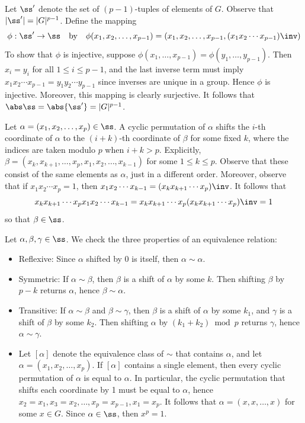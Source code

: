 \begin{solalph}
    \item Let $\ss'$ denote the set of $(p - 1)$-tuples of elements of $G$. Observe that $|\ss'| = |G|^{p-1}$. Define the mapping
    \[\phi : \ss' \to \ss \quad \text{by} \quad \phi(x_1, x_2, \dots, x_{p-1}) = (x_1, x_2, \dots, x_{p-1}, (x_1x_2 \cdots x_{p-1})\inv)\]
    To show that $\phi$ is injective, suppose $\phi(x_1, \dots, x_{p-1}) = \phi(y_1, \dots, y_{p-1})$. Then $x_i = y_i$ for all $1 \leq i \leq p - 1$, and the last inverse term must imply $x_1x_2 \cdots x_{p - 1} = y_1y_2 \cdots y_{p - 1}$ since inverses are unique in a group. Hence $\phi$ is injective. Moreover, this mapping is clearly surjective. It follows that $\abs\ss = \abs{\ss'} = |G|^{p-1}$.
    \item Let $\alpha = (x_1, x_2, \dots, x_p) \in \ss$. A cyclic permutation of $\alpha$ shifts the $i$-th coordinate of $\alpha$ to the $(i + k)$-th coordinate of $\beta$ for some fixed $k$, where the indices are taken modulo $p$ when $i + k > p$. Explicitly, $\beta = (x_k, x_{k+1}, \dots, x_p, x_1, x_2, \dots, x_{k-1})$ for some $1 \leq k \leq p$. Observe that these consist of the same elements as $\alpha$, just in a different order. Moreover, observe that if $x_1x_2 \cdots x_p = 1$, then $x_1x_2 \cdots x_{k - 1} = (x_k x_{k + 1} \cdots x_p)\inv$. It follows that
    \[x_k x_{k+1} \cdots x_p x_1 x_2 \cdots x_{k-1} = x_k x_{k + 1} \cdots x_p (x_k x_{k + 1} \cdots x_p)\inv = 1\]
    so that $\beta \in \ss$.
    \item Let $\alpha, \beta, \gamma \in \ss$. We check the three properties of an equivalence relation:
    \begin{itemize}
        \item Reflexive: Since $\alpha$ shifted by 0 is itself, then $\alpha \sim \alpha$.
        \item Symmetric: If $\alpha \sim \beta$, then $\beta$ is a shift of $\alpha$ by some $k$. Then shifting $\beta$ by $p - k$ returns $\alpha$, hence $\beta \sim \alpha$.
        \item Transitive: If $\alpha \sim \beta$ and $\beta \sim \gamma$, then $\beta$ is a shift of $\alpha$ by some $k_1$, and $\gamma$ is a shift of $\beta$ by some $k_2$. Then shifting $\alpha$ by $(k_1 + k_2) \bmod p$ returns $\gamma$, hence $\alpha \sim \gamma$.
    \end{itemize}
    \begin{itemize}
        \item[\rightimp] Let $[\alpha]$ denote the equivalence class of $\sim$ that contains $\alpha$, and let $\alpha = (x_1, x_2, \dots, x_p)$. If $[\alpha]$ contains a single element, then every cyclic permutation of $\alpha$ is equal to $\alpha$. In particular, the cyclic permutation that shifts each coordinate by 1 must be equal to $\alpha$, hence $x_2 = x_1, x_3 = x_2, \dots, x_p = x_{p-1}, x_1 = x_p$. It follows that $\alpha = (x, x, \dots, x)$ for some $x \in G$. Since $\alpha \in \ss$, then $x^p = 1$.

\end{itemize}
\end{solalph}

